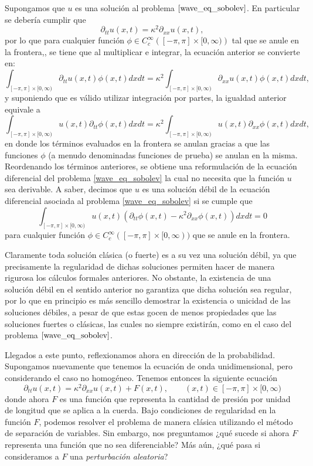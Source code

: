 \documentclass[letterpaper,twoside,12pt]{book}
\newcommand{\1}{\mathds{1}}
\theoremstyle{definition}
\theoremstyle{definition}
\theoremstyle{remark}
\theoremstyle{definition}
\theoremstyle{definition}
\theoremstyle{definition}
\theoremstyle{definition}
\theoremstyle{definition}
\begin{document}
Supongamos que $u$ es una solución al problema $\eqref{wave_eq_sobolev}$. En particular se debería cumplir que 
\[
\partial_{tt}u(x,t)=\kappa^2\partial_{xx}u(x,t),
\]
por lo que para cualquier función $\phi\in C^{\infty}_c\left([-\pi,\pi]\times [0,\infty)\right)$ tal que se anule en la frontera,, se tiene que al multiplicar e integrar, la ecuación anterior se convierte en:
\[
    \int_{[-\pi,\pi]\times [0,\infty)}\partial_{tt}u(x,t)\phi(x,t)dx dt=\kappa^2\int_{[-\pi,\pi]\times [0,\infty)}\partial_{xx}u(x,t)\phi(x,t)dx dt,
\]
y suponiendo que es válido utilizar integración por partes, la igualdad anterior equivale a
\[
\int_{[-\pi,\pi]\times [0,\infty)}u(x,t)\partial_{tt}\phi(x,t)dx dt=\kappa^2\int_{[-\pi,\pi]\times [0,\infty)}u(x,t)\partial_{xx}\phi(x,t)dx dt,
\]
en donde los términos evaluados en la frontera se anulan gracias a que las funciones $\phi$ (a menudo denominadas funciones de prueba) se anulan en la misma. Reordenando los términos anteriores, se obtiene una reformulación de la ecuación diferencial del problema \eqref{wave_eq_sobolev} la cual no necesita que la función $u$ sea derivable. A saber, decimos que $u$ es una solución débil de la ecuación diferencial asociada al problema \eqref{wave_eq_sobolev} si se cumple que 
\[
\int_{[-\pi,\pi]\times [0,\infty)}u(x,t)(\partial_{tt}\phi(x,t)-\kappa^2\partial_{xx}\phi(x,t))dx dt=0    
\]
para cualquier función $\phi\in C^{\infty}_c([-\pi,\pi]\times [0,\infty))$ que se anule en la frontera.

Claramente toda solución clásica (o fuerte) es a su vez una solución débil, ya que precisamente la regularidad de dichas soluciones permiten hacer de manera rigurosa los cálculos formales anteriores.
No obstante, la existencia de una solución débil en el sentido anterior no garantiza que dicha solución sea regular, por lo que en principio es más sencillo demostrar la existencia o unicidad de las soluciones débiles, a pesar de que estas gocen de menos propiedades que las soluciones fuertes o clásicas, las cuales no siempre existirán, como en el caso del problema $\eqref{wave_eq_sobolev}$.

Llegados a este punto, reflexionamos ahora en dirección de la probabilidad. Supongamos nuevamente que tenemos la ecuación de onda unidimensional, pero considerando el caso no homogéneo. Tenemos entonces la siguiente ecuación
\begin{equation}\label{wave_spde}
\partial_{tt}u(x,t)=\kappa^2\partial_{xx}u(x,t)+F(x,t), \qquad (x,t)\in [-\pi,\pi]\times[0,\infty)
\end{equation}
donde ahora $F$ es una función que representa la cantidad de presión por unidad de longitud que se aplica a la cuerda. Bajo condiciones de regularidad en la función $F$, podemos resolver el problema de manera clásica utilizando el método de separación de variables. Sin embargo, nos preguntamos ¿qué sucede si ahora $F$ representa una función que no sea diferenciable? Más aún, ¿qué pasa si consideramos a $F$ una \textit{perturbación aleatoria}?
\end{document}
